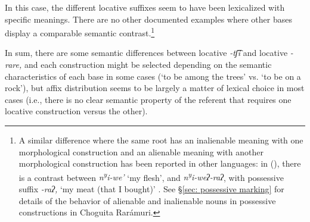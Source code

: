     \label{ex: adessive vs. inessive contrasta}
        \label{ex: adessive vs. inessive contrastb}
    \z
\z

In this case, the different locative suffixes seem to have been lexicalized with specific meanings. There are no other documented examples where other bases display a comparable semantic contrast.\footnote{A similar difference where the same root has an inalienable meaning with one morphological construction and an alienable meaning with another morphological construction has been reported in other  languages: in  (), there is a contrast between \textit{n\textsuperscript{y}}\textit{i-we’} ‘my flesh’, and \textit{n\textsuperscript{y}}\textit{i-weʔ-raʔ}, with possessive suffix \textit{-raʔ,} ‘my meat (that I bought)’ \citep[][302]{dakin1991nahuatl}. See §\ref{sec: possessive marking} for details of the behavior of alienable and inalienable nouns in possessive constructions in Choguita Rarámuri.}

In sum, there are some semantic differences between locative \textit{{}-tʃ͡i} and locative \textit{-rare,} and each construction might be selected depending on the semantic characteristics of each base in some cases (‘to be among the trees’ vs. ‘to be on a rock’), but affix distribution seems to be largely a matter of lexical choice in most cases (i.e., there is no clear semantic property of the referent that requires one locative construction versus the other).

